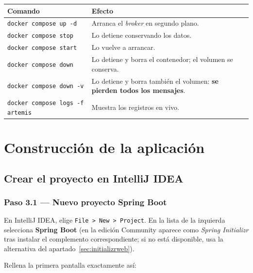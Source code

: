 \documentclass[11pt,a4paper]{book}
\begin{document}
\begin{center}
	\small
	\begin{tabularx}{\textwidth}{@{}p{6.6cm}X@{}}
		\toprule
		\textbf{Comando} & \textbf{Efecto} \\
		\midrule
		\texttt{docker compose up -d}    & Arranca el \emph{broker} en segundo plano. \\
		\texttt{docker compose stop}     & Lo detiene conservando los datos. \\
		\texttt{docker compose start}    & Lo vuelve a arrancar. \\
		\texttt{docker compose down}     & Lo detiene y borra el contenedor; el volumen se conserva. \\
		\texttt{docker compose down -v}  & Lo detiene y borra también el volumen: \textbf{se pierden todos los mensajes}. \\
		\texttt{docker compose logs -f artemis} & Muestra los registros en vivo. \\
		\bottomrule
	\end{tabularx}
\end{center}

\part{Construcción de la aplicación}
\label{parte:construccion}

\chapter{Crear el proyecto en IntelliJ IDEA}
\label{cap:proyecto}

\section{Paso 3.1 --- Nuevo proyecto Spring Boot}

En IntelliJ IDEA, elige \texttt{File > New > Project}.
En la lista de la izquierda selecciona \textbf{Spring Boot} (en la edición Community aparece como \emph{Spring Initializr} tras instalar el complemento correspondiente; si no está disponible, usa la alternativa del apartado~\ref{sec:initializrweb}).

Rellena la primera pantalla exactamente así:
\end{document}
